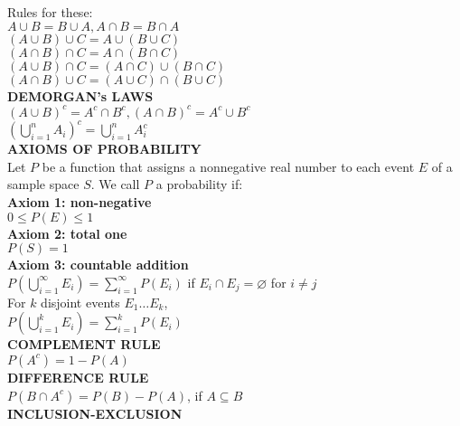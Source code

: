 \documentclass [8pt] {article}
\begin{document}
\begin{multicols*}{2}
Rules for these: \\
\indent $A \cup B = B \cup A, A \cap B = B \cap A$ \\
\indent $(A \cup B) \cup C = A \cup (B \cup C)$ \\
\indent $(A \cap B) \cap C = A \cap (B \cap C)$ \\
\indent $(A \cup B) \cap C = (A \cap C)\cup(B \cap C)$ \\
\indent $(A \cap B)\cup C = (A \cup C)\cap(B \cup C)$ \vspace{2mm} \\
\textbf{DEMORGAN's LAWS} \vspace{2mm} \\
\indent $(A \cup B)^c = A^c \cap B^c, (A \cap B)^c = A^c \cup B^c$ \\
\indent $\left(\bigcup\limits_{i=1}^n A_i\right)^c = \bigcup\limits_{i=1}^n A_i^c$ \vspace{2mm} \\
\textbf{AXIOMS OF PROBABILITY} \\
\indent Let $P$ be a function that assigns a nonnegative real number to each event $E$ of a sample space $S$. We call $P$ a probability if: \\
\indent \textbf{Axiom 1: non-negative} \\
\indent \indent $0 \leq P(E) \leq 1$ \\
\indent \textbf{Axiom 2: total one} \\
\indent \indent $P(S) = 1$ \\
\indent \textbf{Axiom 3: countable addition} \vspace{1mm}\\
\indent \indent $P\left(\bigcup\limits_{i=1}^\infty E_i\right) = \sum\limits_{i=1}^\infty P(E_i) $ if $ E_i \cap E_j = \varnothing $ for $ i \neq j$ \vspace{1mm}\\
\indent \indent For $k$ disjoint events $E_1 \dots E_k$, \\
\indent \indent \indent $P\left(\bigcup\limits_{i=1}^k E_i\right) = \sum\limits_{i=1}^k P(E_i)$ \\
\textbf{COMPLEMENT RULE} \\
\indent $P(A^c) = 1 - P(A)$ \vspace{1mm} \\
\textbf{DIFFERENCE RULE} \\
\indent $P(B \cap A^c) = P(B) - P(A)$, if $A \subseteq B$ \vspace{1mm} \\
\textbf{INCLUSION-EXCLUSION} \\

\end{multicols*}
\end{document}
